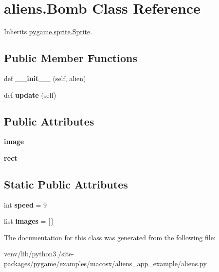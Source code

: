 \hypertarget{classaliens_1_1_bomb}{}\section{aliens.\+Bomb Class Reference}
\label{classaliens_1_1_bomb}


Inherits \hyperlink{classpygame_1_1sprite_1_1_sprite}{pygame.\+sprite.\+Sprite}.

\subsection*{Public Member Functions}
\begin{DoxyCompactItemize}
\item 
\mbox{\label{classaliens_1_1_bomb_a8107a347badd80a6a8884030dbd977a6}} 
def {\bfseries \+\_\+\+\_\+init\+\_\+\+\_\+} (self, alien)
\item 
\mbox{\label{classaliens_1_1_bomb_a32c0fac9ca630f690816a985e9f5e09c}} 
def {\bfseries update} (self)
\end{DoxyCompactItemize}
\subsection*{Public Attributes}
\begin{DoxyCompactItemize}
\item 
\mbox{\label{classaliens_1_1_bomb_af18c515467d5b45b9cbbddaf827891f6}} 
{\bfseries image}
\item 
\mbox{\label{classaliens_1_1_bomb_af83d69f9633c77e356b5ee7679124806}} 
{\bfseries rect}
\end{DoxyCompactItemize}
\subsection*{Static Public Attributes}
\begin{DoxyCompactItemize}
\item 
\mbox{\label{classaliens_1_1_bomb_a888fade681d74cfb948cc7c7dfd46ac1}} 
int {\bfseries speed} = 9
\item 
\mbox{\label{classaliens_1_1_bomb_aafb21ebcfec17a3d4cb4af2210f46375}} 
list {\bfseries images} = \mbox{[}$\,$\mbox{]}
\end{DoxyCompactItemize}


The documentation for this class was generated from the following file\+:\begin{DoxyCompactItemize}
\item 
venv/lib/python3./site-\/packages/pygame/examples/macosx/aliens\+\_\+app\+\_\+example/aliens.\+py\end{DoxyCompactItemize}
